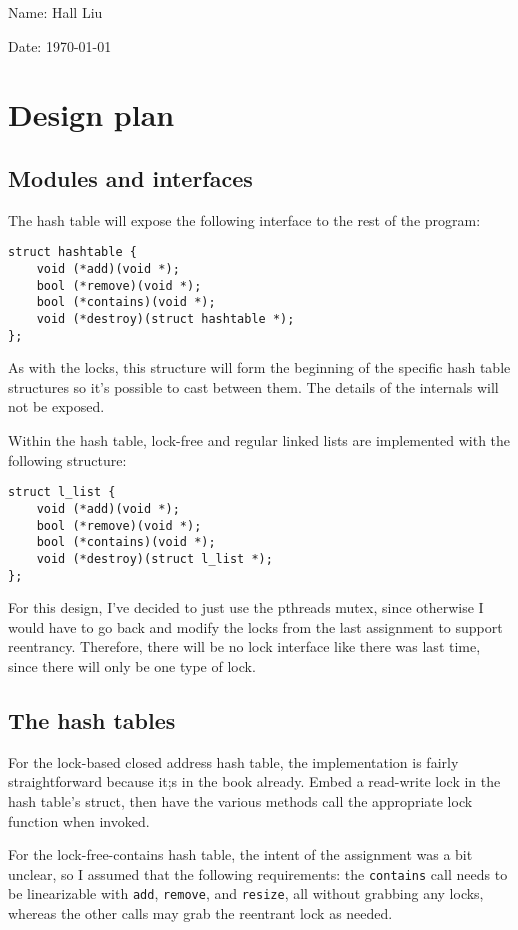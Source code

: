 \documentclass{article}
\begin{document}
Name: Hall Liu

Date: \today 
\vspace{1.5cm}

\section*{Design plan}
\subsection*{Modules and interfaces}
The hash table will expose the following interface to the rest of the program:
\begin{verbatim}
struct hashtable {
    void (*add)(void *);
    bool (*remove)(void *);
    bool (*contains)(void *);
    void (*destroy)(struct hashtable *);
};
\end{verbatim}
As with the locks, this structure will form the beginning of the specific hash table structures so it's possible to cast between them. The details of the internals will not be exposed.

Within the hash table, lock-free and regular linked lists are implemented with the following structure:
\begin{verbatim}
struct l_list {
    void (*add)(void *);
    bool (*remove)(void *);
    bool (*contains)(void *);
    void (*destroy)(struct l_list *);
};
\end{verbatim}
For this design, I've decided to just use the pthreads mutex, since otherwise I would have to go back and modify the locks from the last assignment to support reentrancy. Therefore, there will be no lock interface like there was last time, since there will only be one type of lock.
\subsection*{The hash tables}
For the lock-based closed address hash table, the implementation is fairly straightforward because it;s in the book already. Embed a read-write lock in the hash table's struct, then have the various methods call the appropriate lock function when invoked.

For the lock-free-contains hash table, the intent of the assignment was a bit unclear, so I assumed that the following requirements: the \verb|contains| call needs to be linearizable with \verb|add|, \verb|remove|, and \verb|resize|, all without grabbing any locks, whereas the other calls may grab the reentrant lock as needed. 
\end{document}
